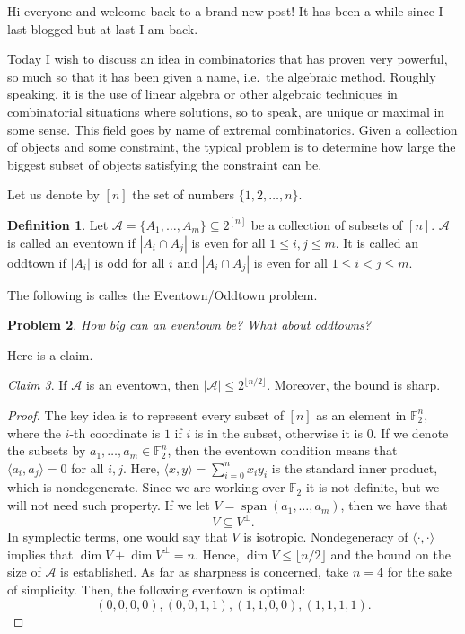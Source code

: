 \documentclass[a4paper, 12pt]{article}
\theoremstyle{definition}
\newtheorem{definition}{Definition}[section]
\theoremstyle{plain}
\newtheorem{problem}[definition]{Problem}
\theoremstyle{remark}
\newtheorem{claim}[definition]{Claim}
\begin{document}
Hi everyone and welcome back to a brand new post! It has been a while since I last blogged but at last I am back.

Today I wish to discuss an idea in combinatorics that has proven very powerful, so much so that it has been given a name, i.e.\ the algebraic method.
Roughly speaking, it is the use of linear algebra or other algebraic techniques in combinatorial situations where solutions, so to speak, are unique or maximal in some sense. This field goes by name of extremal combinatorics. Given a collection of objects and some constraint, the typical problem is to determine how large the biggest subset of objects satisfying the constraint can be.

Let us denote by \( [n] \) the set of numbers \( \{ 1, 2, \dots, n \} \).
\begin{definition}
    Let \( \mathcal{A} = \{ A_1, \dots, A_m \} \subseteq 2^{[n]} \) be a collection of subsets of \( [n] \). \( \mathcal{A} \) is called an eventown if \( \left| A_i \cap A_j \right| \) is even for all \( 1 \leq i, j \leq m \). It is called an oddtown if \( \left| A_i \right| \) is odd for all \( i \) and \( \left| A_i \cap A_j \right| \) is even for all \( 1 \leq i < j \leq m \).
\end{definition}

The following is calles the Eventown/Oddtown problem.

\begin{problem}
    How big can an eventown be? What about oddtowns?
\end{problem}
Here is a claim.
\begin{claim}
    If \( \mathcal{A} \) is an eventown, then \( \left| \mathcal{A} \right| \leq 2^{\lfloor n/2 \rfloor} \). Moreover, the bound is sharp.
\end{claim}
\begin{proof}
    The key idea is to represent every subset of \( [n] \) as an element in \( \mathbb{F}_2^n \), where the \( i \)-th coordinate is \( 1 \) if \( i \) is in the subset, otherwise it is \( 0 \). If we denote the subsets by \( a_1, \dots, a_m \in \mathbb{F}_2^n \), then the eventown condition means that \( \langle a_i, a_j \rangle = 0 \) for all \( i, j \). Here, \( \langle x, y \rangle = \sum_{i = 0}^n x_iy_i \) is the standard inner product, which is nondegenerate. Since we are working over \( \mathbb{F}_2 \) it is not definite, but we will not need such property. If we let \( V = \operatorname{span}(a_1, \dots, a_m) \), then we have that
    \begin{equation*}
        V \subseteq V^{\perp}.
    \end{equation*}
    In symplectic terms, one would say that \( V \) is isotropic. Nondegeneracy of \( \langle \cdot{, \cdot} \rangle \) implies that \( \dim V + \dim V^{\perp} = n \). Hence, \( \dim V \leq \lfloor n/2 \rfloor \) and the bound on the size of \( \mathcal{A} \) is established.
    As far as sharpness is concerned, take \( n = 4 \) for the sake of simplicity. Then, the following eventown is optimal:
\begin{equation*}
    (0, 0, 0, 0), (0, 0, 1, 1), (1, 1, 0, 0), (1, 1, 1, 1).
\end{equation*}
\end{proof}
\end{document}
